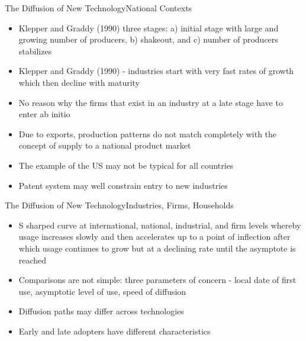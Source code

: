 \documentclass{beamer}
\begin{document}
\begin{frame}{The Diffusion of New Technology}{National Contexts}
\begin{itemize}
\item{Klepper and Graddy (1990)  three stages: a) initial stage with large and growing number of producers, b) shakeout, and c) number of producers stabilizes}
\item{Klepper and Graddy (1990) - industries start with very fast rates of growth which then decline with maturity}
\item{No reason why the firms that exist in an industry at a late stage have to enter ab initio}
\item{Due to exports, production patterns do not match completely with the concept of supply to a national product market}
\item{The example of the US may not be typical for all countries}
\item{Patent system may well constrain entry to new industries}
\end{itemize}
\end{frame}

\begin{frame}{The Diffusion of New Technology}{Industries, Firms, Households}
\begin{itemize}
\item{S sharped curve at international, national, industrial, and firm levels whereby usage increases slowly and then accelerates up to a point of inflection after which usage continues to grow but at a declining rate until the asymptote is reached}
\item{Comparisons are not simple: three parameters of concern - local date of first use, asymptotic level of use, speed of diffusion}
\item{Diffusion paths may differ across technologies}
\item{Early and late adopters have different characteristics}
\end{itemize}
\end{frame}
\end{document}
